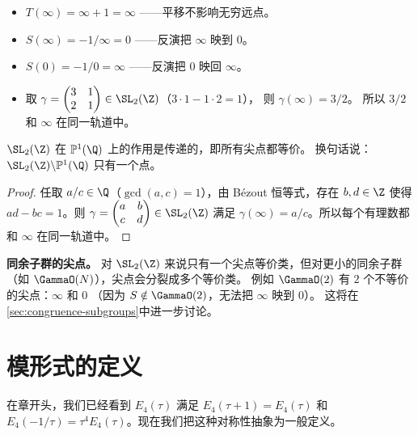 \begin{example}[具体的尖点变换]
\label{ex:cusp-action}
\leavevmode
\begin{itemize}
  \item $T(\infty) = \infty + 1 = \infty$
    ——平移不影响无穷远点。
  \item $S(\infty) = -1/\infty = 0$
    ——反演把 $\infty$ 映到 $0$。
  \item $S(0) = -1/0 = \infty$
    ——反演把 $0$ 映回 $\infty$。
  \item 取 $\gamma = \begin{pmatrix} 3 & 1 \\ 2 & 1 \end{pmatrix}
    \in \SL_2(\Z)$（$3 \cdot 1 - 1 \cdot 2 = 1$），
    则 $\gamma(\infty) = 3/2$。
    所以 $3/2$ 和 $\infty$ 在同一轨道中。
\end{itemize}
\end{example}

\begin{proposition}
\label{prop:cusps-transitive}
$\SL_2(\Z)$ 在 $\mathbb{P}^1(\Q)$ 上的作用是传递的，即所有尖点都等价。
换句话说：$\SL_2(\Z) \backslash \mathbb{P}^1(\Q)$ 只有一个点。
\end{proposition}

\begin{proof}
任取 $a/c \in \Q$（$\gcd(a,c) = 1$），由 Bézout 恒等式，存在 $b, d \in \Z$
使得 $ad - bc = 1$。则
$\gamma = \begin{pmatrix} a & b \\ c & d \end{pmatrix} \in \SL_2(\Z)$
满足 $\gamma(\infty) = a/c$。所以每个有理数都和 $\infty$ 在同一轨道中。
\end{proof}

\textbf{同余子群的尖点。}
对 $\SL_2(\Z)$ 来说只有一个尖点等价类，但对更小的同余子群
（如 $\GammaO(N)$），尖点会分裂成多个等价类。
例如 $\GammaO(2)$ 有 $2$ 个不等价的尖点：$\infty$ 和 $0$
（因为 $S \notin \GammaO(2)$，无法把 $\infty$ 映到 $0$）。
这将在\cref{sec:congruence-subgroups}中进一步讨论。


\section{模形式的定义}
\label{sec:modular-forms-def}

在章开头，我们已经看到 $E_4(\tau)$ 满足 $E_4(\tau+1) = E_4(\tau)$ 和
$E_4(-1/\tau) = \tau^4 E_4(\tau)$。现在我们把这种对称性抽象为一般定义。

